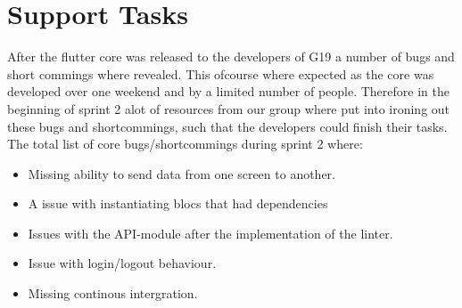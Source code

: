 \section{Support Tasks}
After the flutter core was released to the developers of \gls{G19} a number of bugs and short commings where revealed. This ofcourse where expected as the core was developed over one weekend and by a limited number of people. Therefore in the beginning of sprint 2 alot of resources from our group where put into ironing out these bugs and shortcommings, such that the developers could finish their tasks. The total list of core bugs/shortcommings during sprint 2 where:
\begin{itemize}
  \item Missing ability to send data from one screen to another.
  \item A issue with instantiating \glspl{bloc} that had dependencies
  \item Issues with the API-module after the implementation of the linter.
  \item Issue with login/logout behaviour.
  \item Missing continous intergration.
\end{itemize}